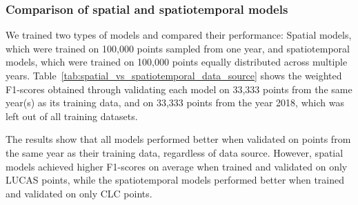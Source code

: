         \clearpage
        

         

    \subsubsection*{Comparison of spatial and spatiotemporal models}
        \label{sec:results-spatial_vs_spatiotemporal}
    
        We trained two types of models and compared their performance: Spatial models, which were trained on 100,000 points sampled from one year, and spatiotemporal models, which were trained on 100,000 points equally distributed across multiple years. Table\@~\ref{tab:spatial_vs_spatiotemporal_data_source} shows the weighted F1-scores obtained through validating each model on 33,333 points from the same year(s) as its training data, and on 33,333 points from the year 2018, which was left out of all training datasets. 

        The results show that all models performed better when validated on points from the same year as their training data, regardless of data source. However, spatial models achieved higher F1-scores on average when trained and validated on only LUCAS points, while the spatiotemporal models performed better when trained and validated on only CLC points.
        
